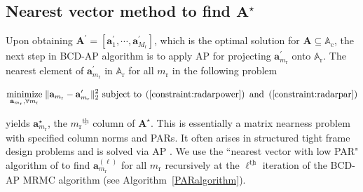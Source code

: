 \documentclass[10pt,journal]{IEEEtran}
\newcommand{\paren}[1]{\left({#1}\right)}
\newcommand{\bracket}[1]{{\left [{#1}\right ]}}
\newcommand{\ith}[1]    {{#1}^{\underline{\text{th}}}}
\newcommand{\rr}{_\mathrm{r}}
\theoremstyle{definition}
\begin{document}
\subsection{Nearest vector method to find $\mathbf{A}^\star$}
\label{subsec: PAR}
Upon obtaining $\mathbf{A}^\prime=\bracket{\mathbf{a}^\prime_{1},\cdots,\mathbf{a}^\prime_{M\rr}}$, which is the optimal solution for $\mathbf{A}\subseteq\mathbb{A}_{\textrm{c}}$, the next step in BCD-AP algorithm is to apply AP for projecting $\mathbf{a}^\prime_{m\rr}$ onto $\mathbb{A}_{\textrm{r}}$. 
The nearest element of $\mathbf{a}^\prime_{m\rr}$ in $\mathbb{A}_{\textrm{r}}$ for all $m\rr$ in the following problem
\par\noindent\small
\begin{equation}
\label{radarmiop}
\underset{\mathbf{a}_{m\rr},\forall m\rr}{\text{minimize}}\;\lVert\mathbf{a}_{m\rr}-\mathbf{a}^\prime_{m\rr}\rVert^2_2\text{ subject to}\;  \paren{\mathrm{\ref{constraint:radarpower}}}\textrm{ and }\paren{\mathrm{\ref{constraint:radarpar}}}
\end{equation}\normalsize

yields $\mathbf{a}^\star_{m\rr}$, the $\ith{m\rr}$ column of $\mathbf{A}^\star$. This is essentially a matrix nearness problem with specified column norms and PARs. It often arises in structured tight frame design problems and is solved via AP \cite{nearestvector,arXiv180203889Z}. We use the ``nearest vector with low PAR" algorithm of \cite{nearestvector} to find $\mathbf{a}^{\paren{\ell}}_{m\rr}$ for all $m\rr$ recursively at the $\ith{\ell}$ iteration of the BCD-AP MRMC algorithm (see Algorithm~\ref{PARalgorithm}).
\end{document}
